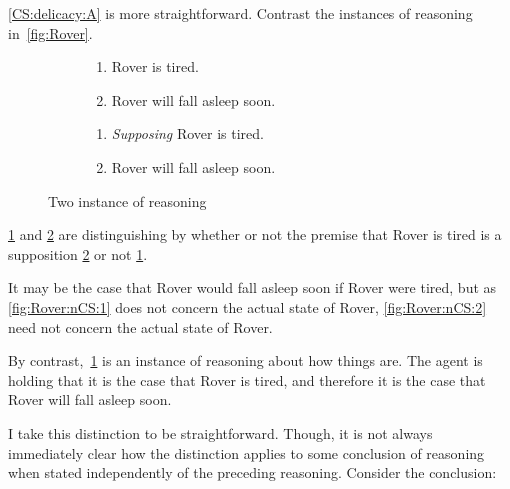 \begin{note}[Suppositions]
  \ref{CS:delicacy:A} is more straightforward.
  Contrast the instances of reasoning in~\autoref{fig:Rover}.
  \begin{figure}[h!]
    \mbox{}\hfill
    \begin{subfigure}{0.45\linewidth}
      \begin{enumerate}[label=\arabic*.,ref=(\arabic*)]
      \item
        \label{fig:Rover:CS:1}
        Rover is tired.
      \item
        \label{fig:Rover:CS:2}
        Rover will fall asleep soon.
      \end{enumerate}
      \caption{}
      \label{fig:Rover:CS}
    \end{subfigure}
    \hfill
    \begin{subfigure}{0.45\linewidth}
      \begin{enumerate}[label=\arabic*\('\).,ref=(\arabic*\('\))]
      \item
        \label{fig:Rover:nCS:1}
        \emph{Supposing} Rover is tired.
      \item
        \label{fig:Rover:nCS:2}
        Rover will fall asleep soon.
      \end{enumerate}
      \caption{}
      \label{fig:Rover:nCS}
    \end{subfigure}
    \hfill\mbox{}
    \caption{Two instance of reasoning}
    \label{fig:Rover}
  \end{figure}

  \ref{fig:Rover:CS} and \ref{fig:Rover:nCS} are distinguishing by whether or not the premise that Rover is tired is a supposition \ref{fig:Rover:nCS} or not \ref{fig:Rover:CS}.

  It may be the case that Rover would fall asleep soon if Rover were tired, but as \ref{fig:Rover:nCS:1} does not concern the actual state of Rover, \ref{fig:Rover:nCS:2} need not concern the actual state of Rover.

  By contrast,~\ref{fig:Rover:CS} is an instance of reasoning about how things are.
  The agent is holding that it is the case that Rover is tired, and therefore it is the case that Rover will fall asleep soon.

  I take this distinction to be straightforward.
  Though, it is not always immediately clear how the distinction applies to some conclusion of reasoning when stated independently of the preceding reasoning.
  Consider the conclusion:


\end{note}
